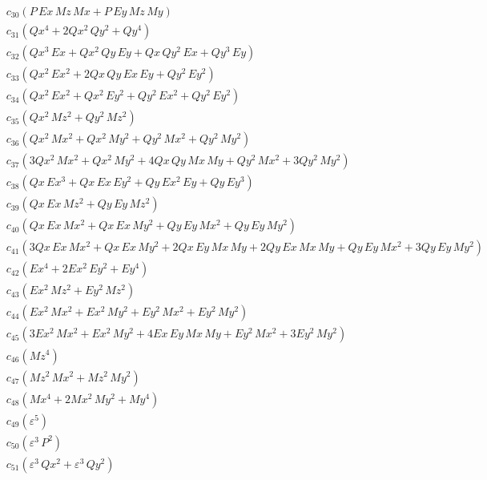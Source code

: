 \documentclass{article}
\begin{document}
\begin{align*}
  &\quad c_{30} \left(P\,Ex\,Mz\,Mx + P\,Ey\,Mz\,My\right) \\
  &\quad c_{31} \left(Qx^{4} + 2Qx^{2}\,Qy^{2} + Qy^{4}\right) \\
  &\quad c_{32} \left(Qx^{3}\,Ex + Qx^{2}\,Qy\,Ey + Qx\,Qy^{2}\,Ex + Qy^{3}\,Ey\right) \\
  &\quad c_{33} \left(Qx^{2}\,Ex^{2} + 2Qx\,Qy\,Ex\,Ey + Qy^{2}\,Ey^{2}\right) \\
  &\quad c_{34} \left(Qx^{2}\,Ex^{2} + Qx^{2}\,Ey^{2} + Qy^{2}\,Ex^{2} + Qy^{2}\,Ey^{2}\right) \\
  &\quad c_{35} \left(Qx^{2}\,Mz^{2} + Qy^{2}\,Mz^{2}\right) \\
  &\quad c_{36} \left(Qx^{2}\,Mx^{2} + Qx^{2}\,My^{2} + Qy^{2}\,Mx^{2} + Qy^{2}\,My^{2}\right) \\
  &\quad c_{37} \left(3Qx^{2}\,Mx^{2} + Qx^{2}\,My^{2} + 4Qx\,Qy\,Mx\,My + Qy^{2}\,Mx^{2} + 3Qy^{2}\,My^{2}\right) \\
  &\quad c_{38} \left(Qx\,Ex^{3} + Qx\,Ex\,Ey^{2} + Qy\,Ex^{2}\,Ey + Qy\,Ey^{3}\right) \\
  &\quad c_{39} \left(Qx\,Ex\,Mz^{2} + Qy\,Ey\,Mz^{2}\right) \\
  &\quad c_{40} \left(Qx\,Ex\,Mx^{2} + Qx\,Ex\,My^{2} + Qy\,Ey\,Mx^{2} + Qy\,Ey\,My^{2}\right) \\
  &\quad c_{41} \left(3Qx\,Ex\,Mx^{2} + Qx\,Ex\,My^{2} + 2Qx\,Ey\,Mx\,My + 2Qy\,Ex\,Mx\,My + Qy\,Ey\,Mx^{2} + 3Qy\,Ey\,My^{2}\right) \\
  &\quad c_{42} \left(Ex^{4} + 2Ex^{2}\,Ey^{2} + Ey^{4}\right) \\
  &\quad c_{43} \left(Ex^{2}\,Mz^{2} + Ey^{2}\,Mz^{2}\right) \\
  &\quad c_{44} \left(Ex^{2}\,Mx^{2} + Ex^{2}\,My^{2} + Ey^{2}\,Mx^{2} + Ey^{2}\,My^{2}\right) \\
  &\quad c_{45} \left(3Ex^{2}\,Mx^{2} + Ex^{2}\,My^{2} + 4Ex\,Ey\,Mx\,My + Ey^{2}\,Mx^{2} + 3Ey^{2}\,My^{2}\right) \\
  &\quad c_{46} \left(Mz^{4}\right) \\
  &\quad c_{47} \left(Mz^{2}\,Mx^{2} + Mz^{2}\,My^{2}\right) \\
  &\quad c_{48} \left(Mx^{4} + 2Mx^{2}\,My^{2} + My^{4}\right) \\
  &\quad c_{49} \left(ε^{5}\right) \\
  &\quad c_{50} \left(ε^{3}\,P^{2}\right) \\
  &\quad c_{51} \left(ε^{3}\,Qx^{2} + ε^{3}\,Qy^{2}\right) \\

\end{align*}
\end{document}
